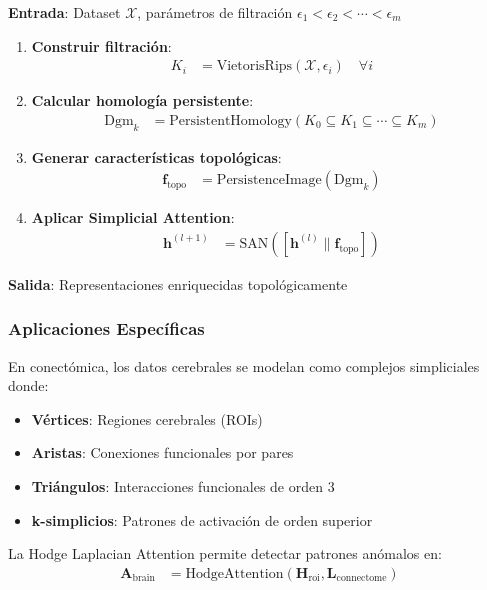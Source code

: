 \begin{algorithm}
\caption{Simplicial Attention con TDA}\label{alg:sat_tda}
\textbf{Entrada}: Dataset $\mathcal{X}$, parámetros de filtración $\epsilon_1 < \epsilon_2 < \cdots < \epsilon_m$

\begin{enumerate}
    \item \textbf{Construir filtración}:
    \begin{align}
        K_i &= \text{VietorisRips}(\mathcal{X}, \epsilon_i) \quad \forall i
    \end{align}
    
    \item \textbf{Calcular homología persistente}:
    \begin{align}
        \text{Dgm}_k &= \text{PersistentHomology}(K_0 \subseteq K_1 \subseteq \cdots \subseteq K_m)
    \end{align}
    
    \item \textbf{Generar características topológicas}:
    \begin{align}
        \mathbf{f}_{\text{topo}} &= \text{PersistenceImage}(\text{Dgm}_k)
    \end{align}
    
    \item \textbf{Aplicar Simplicial Attention}:
    \begin{align}
        \mathbf{h}^{(l+1)} &= \text{SAN}([\mathbf{h}^{(l)} \| \mathbf{f}_{\text{topo}}])
    \end{align}
\end{enumerate}

\textbf{Salida}: Representaciones enriquecidas topológicamente
\end{algorithm}

\subsubsection{Aplicaciones Específicas}

\begin{application}\label{app:redes_cerebrales}
En conectómica, los datos cerebrales se modelan como complejos simpliciales donde:
\begin{itemize}
    \item \textbf{Vértices}: Regiones cerebrales (ROIs)
    \item \textbf{Aristas}: Conexiones funcionales por pares
    \item \textbf{Triángulos}: Interacciones funcionales de orden 3
    \item \textbf{k-simplicios}: Patrones de activación de orden superior
\end{itemize}

La Hodge Laplacian Attention permite detectar patrones anómalos en:
\begin{align}
    \mathbf{A}_{\text{brain}} &= \text{HodgeAttention}(\mathbf{H}_{\text{roi}}, \mathbf{L}_{\text{connectome}})
\end{align}
\end{application}

